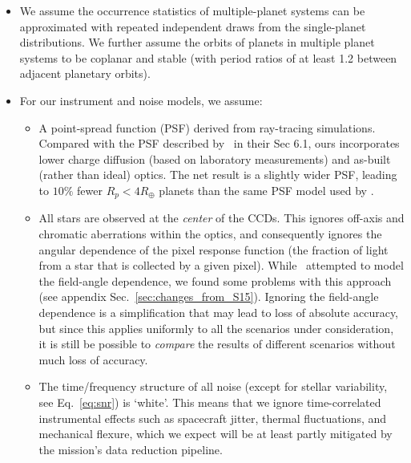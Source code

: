 \begin{itemize}
	\item We assume the occurrence statistics of multiple-planet systems 	
		  can be approximated with repeated independent draws from the 
		  single-planet distributions. We further assume the orbits of planets 
		  in multiple planet systems to be 
		  coplanar and stable (with period ratios of at least 1.2 between 
		  adjacent planetary orbits).
          
	\item For our instrument and noise models, we assume:
	  \begin{itemize}
            
	  \item A point-spread function (PSF) derived from ray-tracing
            simulations.
            Compared with the PSF described by~ in 
            their Sec 6.1, ours incorporates lower charge diffusion (based on 
            laboratory measurements) and as-built (rather than ideal) optics.
            The net result is a slightly wider PSF, leading to $10\%$ fewer 
            $R_p<4R_\oplus$ planets than
            the same PSF model used by .
            
          \item All stars are observed at the \textit{center} of the
            \tess CCDs. This ignores off-axis and chromatic
            aberrations within the \tess optics, and consequently
            ignores the angular dependence of the pixel response
            function (the fraction of light from a star that is
            collected by a given pixel).
            While~ attempted to model the
            field-angle dependence, we found some problems with this approach (see appendix
            Sec.~\ref{sec:changes_from_S15}).  
            Ignoring the field-angle dependence is a simplification that may 
            lead to loss of absolute accuracy, but since this applies uniformly 
            to all 
            the scenarios under consideration, it is still be possible
            to {\it compare} the results of different scenarios
            without much loss of accuracy.
            
         \item The time/frequency structure of all noise (except for
           stellar variability, see Eq.~\ref{eq:snr}) is `white'.  
           This means that we ignore time-correlated instrumental effects 
           such as spacecraft jitter, thermal fluctuations, and mechanical
           flexure, which we expect will be at least partly mitigated
           by the mission's data reduction pipeline.
                  

\end{itemize}
\end{itemize}
